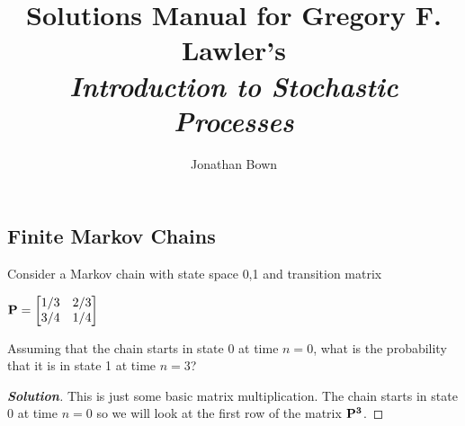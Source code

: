 \documentclass[12pt]{book}
\newenvironment{problem}[2][Problem]{\begin{trivlist}
\item[\hskip \labelsep {\bfseries #1}\hskip \labelsep {\bfseries #2.}]}{\end{trivlist}}
\newenvironment{solution}
               {\let\oldqedsymbol=\qedsymbol
                \renewcommand{\qedsymbol}{$\square$}
                \begin{proof}[\bfseries\upshape Solution]}
               {\end{proof}
                \renewcommand{\qedsymbol}{\oldqedsymbol}}
\begin{document}

\title{Solutions Manual for Gregory F. Lawler's \\ \emph{Introduction to Stochastic Processes}}%
\author{Jonathan Bown}
\date{}

\maketitle

\part{}

\chapter{Finite Markov Chains}



\begin{problem}{1.1}
\end{problem}


\begin{problem}{1.2}
Consider a Markov chain with state space {0,1} and transition matrix\\
\begin{center}
$\bf{P} = \begin{bmatrix}
    1/3 & 2/3 \\
    3/4 & 1/4 
\end{bmatrix}$
\end{center}
Assuming that the chain starts in state $0$ at time $n = 0$, what is the probability that it is in state 1 at time $n=3$?
\end{problem}
\begin{solution}
This is just some basic matrix multiplication. The chain starts in state 0 at time $n = 0$ so we will look at the first row of the matrix $\bf{P}^3$. 
\end{solution}
\end{document}
